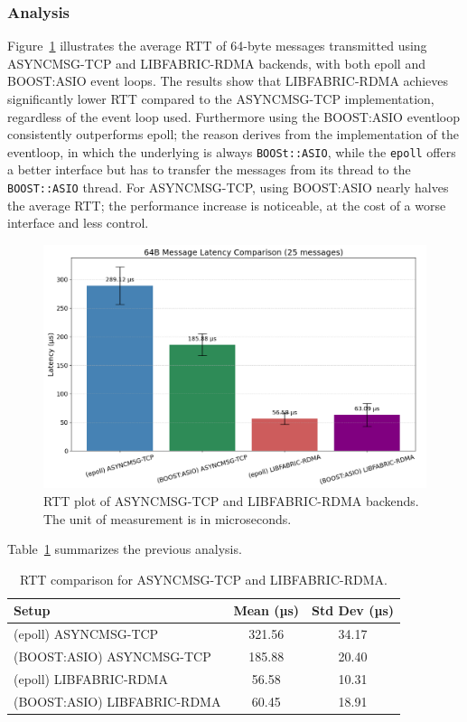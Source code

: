 \subsubsection{Analysis}

Figure~\ref{fig:rtt-tcp-rdma} illustrates the average \acs{RTT} of 64-byte messages transmitted using ASYNCMSG-TCP and LIBFABRIC-RDMA backends, with both epoll and BOOST:ASIO event loops. The results show that LIBFABRIC-RDMA achieves significantly lower \acs{RTT} compared to the ASYNCMSG-TCP implementation, regardless of the event loop used. Furthermore using the BOOST:ASIO eventloop consistently outperforms epoll; the reason derives from the implementation of the eventloop, in which the underlying is always \texttt{BOOSt::ASIO}, while the \texttt{epoll} offers a better interface but has to transfer the messages from its thread to the \texttt{BOOST::ASIO} thread.
For ASYNCMSG-TCP, using BOOST:ASIO nearly halves the average \acs{RTT}; the performance increase is noticeable, at the cost of a worse interface and less control.

\begin{figure}[htbp]
\centering
\includegraphics[width=\textwidth]{images/results/rtt.png}
\caption[RTT plot]{RTT plot of ASYNCMSG-TCP and LIBFABRIC-RDMA backends. The unit of measurement is in microseconds.}
\label{fig:rtt-tcp-rdma}
\end{figure}

Table~\ref{tab:rtt-comparison} summarizes the previous analysis.

\begin{table}[ht]
\centering
\begin{tabular}{|l|c|c|}
\hline
\textbf{Setup} & \textbf{Mean (µs)} & \textbf{Std Dev (µs)} \\
\hline
(epoll) ASYNCMSG-TCP & 321.56 & 34.17 \\
(BOOST:ASIO) ASYNCMSG-TCP & 185.88 & 20.40 \\
(epoll) LIBFABRIC-RDMA & 56.58 & 10.31 \\
(BOOST:ASIO) LIBFABRIC-RDMA & 60.45 & 18.91 \\
\hline
\end{tabular}
\caption{RTT comparison for ASYNCMSG-TCP and LIBFABRIC-RDMA.}
\label{tab:rtt-comparison}
\end{table}

